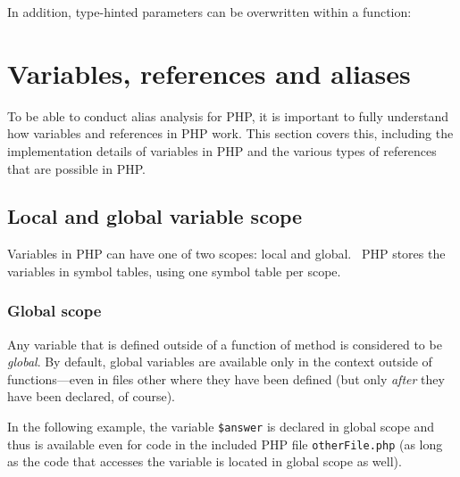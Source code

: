 
In addition, type-hinted parameters can be overwritten within a function:


\section{Variables, references and aliases}

To be able to conduct alias analysis for PHP, it is important to fully understand how variables and references in PHP work. This section covers this, including the implementation details of variables in PHP and the various types of references that are possible in PHP.


\subsection{Local and global variable scope}
\label{sec:variable-scope}

Variables in PHP can have one of two scopes: local and global.~\cite{php-manual-scope} PHP stores the variables in symbol tables, using one symbol table per scope.~\cite{php-manual-reference-counting}

\subsubsection{Global scope}

Any variable that is defined outside of a function of method is considered to be \emph{global}. By default, global variables are available only in the context outside of functions---even in files other where they have been defined (but only \emph{after} they have been declared, of course).

In the following example, the variable \texttt{\$answer} is declared in global scope and thus is available even for code in the included PHP file \texttt{otherFile.php} (as long as the code that accesses the variable is located in global scope as well).

